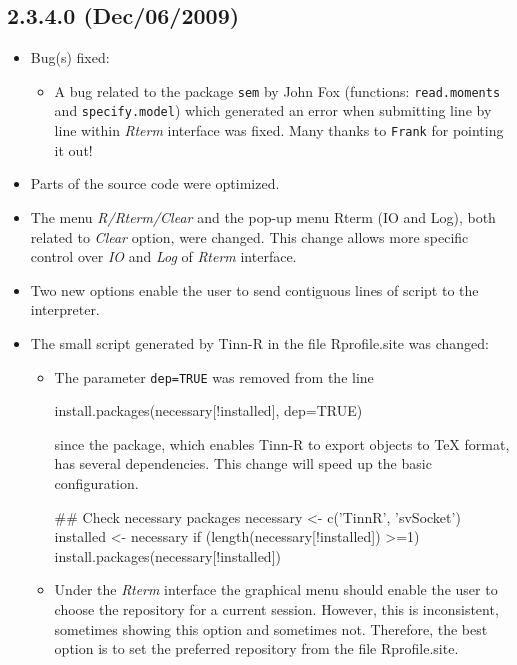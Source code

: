 \subsection{2.3.4.0 (Dec/06/2009)}

\begin{itemize}
  \item Bug(s) fixed:
    \begin{itemize}
      \item A bug related to the package \texttt{sem} by John Fox
        (functions: \texttt{read.moments} and \texttt{specify.model})
        which generated an error when submitting line by line within
        \textit{Rterm} interface was fixed. Many thanks to \texttt{Frank}
        for pointing it out!
    \end{itemize}
  \item Parts of the source code were optimized.
  \item The menu \textit{R/Rterm/Clear} and the pop-up menu Rterm
    (IO and Log), both related to \textit{Clear} option, were changed.
    This change allows more specific control over \textit{IO} and
    \textit{Log} of \textit{Rterm} interface.
  \item Two new options enable the user to send contiguous lines
    of script to the \RR{} interpreter.
  \item The small script generated by Tinn-R in the file Rprofile.site was
    changed:
    \begin{itemize}
      \item The parameter \texttt{dep=TRUE} was removed from the line

        \begin{Scode}
          install.packages(necessary[!installed], dep=TRUE)
        \end{Scode}

        since the  package, which enables Tinn-R to export
        \RR{} objects to TeX format, has several dependencies. This
        change will speed up the basic \RR{} configuration.

        \begin{Scode}
          ## Check necessary packages
          necessary <- c('TinnR', 'svSocket')
          installed <- necessary %
          if (length(necessary[!installed]) >=1)
          install.packages(necessary[!installed])
        \end{Scode}

      \item Under the \textit{Rterm} interface the graphical menu should enable the
        user to choose the repository for a current session. However, this is
        inconsistent, sometimes showing this option and sometimes not. Therefore,
        the best option is to set the preferred repository from the file Rprofile.site.
    \end{itemize}
\end{itemize}


